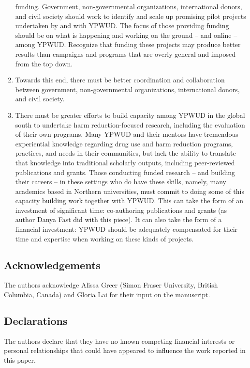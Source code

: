 \documentclass[
  letterpaper,
  DIV=11,
  numbers=noendperiod]{scrartcl}
\begin{document}
\begin{enumerate}
  funding. Government, non-governmental organizations, international
  donors, and civil society should work to identify and scale up
  promising pilot projects undertaken by and with YPWUD. The focus of
  those providing funding should be on what is happening and working on
  the ground -- and online -- among YPWUD. Recognize that funding these
  projects may produce better results than campaigns and programs that
  are overly general and imposed from the top down.
\item
  Towards this end, there must be better coordination and collaboration
  between government, non-governmental organizations, international
  donors, and civil society.
\item
  There must be greater efforts to build capacity among YPWUD in the
  global south to undertake harm reduction-focused research, including
  the evaluation of their own programs. Many YPWUD and their mentors
  have tremendous experiential knowledge regarding drug use and harm
  reduction programs, practices, and needs in their communities, but
  lack the ability to translate that knowledge into traditional
  scholarly outputs, including peer-reviewed publications and grants.
  Those conducting funded research -- and building their careers -- in
  these settings who do have these skills, namely, many academics based
  in Northern universities, must commit to doing some of this capacity
  building work together with YPWUD. This can take the form of an
  investment of significant time: co-authoring publications and grants
  (as author Danya Fast did with this piece). It can also take the form
  of a financial investment: YPWUD should be adequately compensated for
  their time and expertise when working on these kinds of projects.
\end{enumerate}

\subsection{Acknowledgements}\label{acknowledgements}

The authors acknowledge Alissa Greer (Simon Fraser University, British
Columbia, Canada) and Gloria Lai for their input on the manuscript.

\subsection{Declarations}\label{declarations}

The authors declare that they have no known competing financial
interests or personal relationships that could have appeared to
influence the work reported in this paper.
\end{document}

